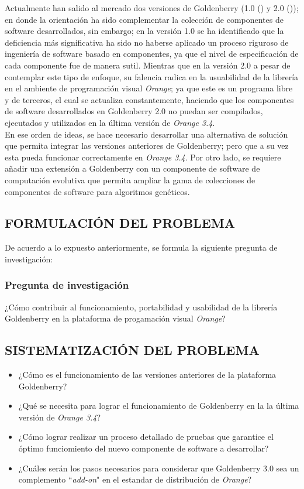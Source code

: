 Actualmente han salido al mercado dos versiones de Goldenberry (1.0 (\cite{Rojas-Galeano2013}) y 2.0 (\cite{LeidyVisual})); en donde la orientación ha sido complementar la colección de componentes de software desarrollados, sin embargo; en la versión 1.0 se ha identificado que la deficiencia más significativa ha sido no haberse aplicado un proceso riguroso de ingeniería de software basado en componentes, ya que el nivel de especificación de cada componente fue de manera sutil. Mientras que en la versión 2.0 a pesar de contemplar este tipo de enfoque, su falencia radica en la usuabilidad de la librería en el ambiente de programación visual \textit{Orange}; ya que este es un programa libre y de terceros, el cual se actualiza constantemente, haciendo que los componentes de software desarrollados en Goldenberry 2.0 no puedan ser compilados, ejecutados y utilizados en la última versión de \textit{Orange 3.4}.\\

En ese orden de ideas, se hace necesario desarrollar una alternativa de solución que permita integrar las versiones anteriores de Goldenberry; pero que a su vez esta pueda funcionar correctamente en \textit{Orange 3.4}.  Por otro lado, se requiere añadir una extensión a Goldenberry con un componente de software de computación evolutiva que permita ampliar la gama de colecciones de componentes de software para algoritmos genéticos.\\           

\subsection{FORMULACIÓN DEL PROBLEMA}
De acuerdo a lo expuesto anteriormente, se formula la siguiente pregunta de investigación:

\subsubsection{Pregunta de investigación}
¿Cómo contribuir al funcionamiento, portabilidad y usabilidad de la librería Goldenberry en la plataforma de progamación visual \textit{Orange}?

\subsection{SISTEMATIZACIÓN DEL PROBLEMA}
\begin{itemize}
	\item ¿Cómo es el funcionamiento de las versiones anteriores de la plataforma Goldenberry?
	\item ¿Qué se necesita para lograr el funcionamiento de Goldenberry en la la última versión de \textit{Orange 3.4}? 
	\item ¿Cómo lograr realizar un proceso detallado de pruebas que garantice el óptimo funciomiento del nuevo componente de software a desarrollar?   
	\item ¿Cuáles serán los pasos necesarios para considerar que Goldenberry 3.0 sea un complemento ``\textit{add-on}" en el estandar de distribución de \textit{Orange}?
\end{itemize}